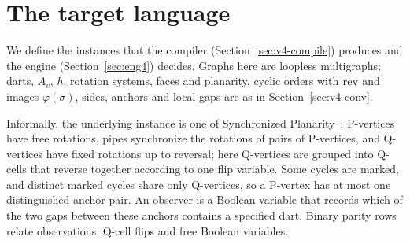 \section{The target language}\label{sec:v4-lang}

We define the instances that the compiler (Section~\ref{sec:v4-compile})
produces and the engine (Section~\ref{sec:eng4}) decides. Graphs here are
loopless multigraphs; darts, $A_v$, $\bar h$, rotation systems, faces and
planarity, cyclic orders with $\operatorname{rev}$ and images $\varphi(\sigma)$, sides,
anchors and local gaps are as in Section~\ref{sec:v4-conv}.

Informally, the underlying instance is one of Synchronized
Planarity~\cite{BFR21}: P-vertices have free rotations, pipes synchronize
the rotations of pairs of P-vertices, and Q-vertices have fixed rotations up
to reversal; here Q-vertices are grouped into Q-cells that reverse together
according to one flip variable. Some cycles are marked, and distinct marked
cycles share only Q-vertices, so a P-vertex has at most one distinguished
anchor pair. An observer is a Boolean variable that records which of the two
gaps between these anchors contains a specified dart. Binary parity rows
relate observations, Q-cell flips and free Boolean variables.

